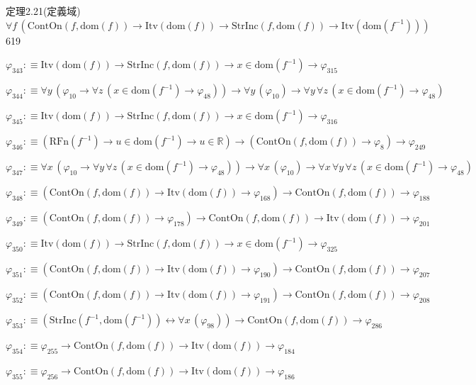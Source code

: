 \begin{fullproof}{定理2.21(定義域)}{$\forall f\,(\mathrm{ContOn}(f,\mathrm{dom}(f)) \to \mathrm{Itv}(\mathrm{dom}(f)) \to \mathrm{StrInc}(f,\mathrm{dom}(f)) \to \mathrm{Itv}(\mathrm{dom}(f^{-1})))$}{619}
\begin{abbrevlist}
\item $\varphi_{343} :\equiv \mathrm{Itv}(\mathrm{dom}(f)) \to \mathrm{StrInc}(f,\mathrm{dom}(f)) \to x \in \mathrm{dom}(f^{-1}) \to \varphi_{315}$
\item $\varphi_{344} :\equiv \forall y\,(\varphi_{10} \to \forall z\,(x \in \mathrm{dom}(f^{-1}) \to \varphi_{48})) \to \forall y\,(\varphi_{10}) \to \forall y\,\forall z\,(x \in \mathrm{dom}(f^{-1}) \to \varphi_{48})$
\item $\varphi_{345} :\equiv \mathrm{Itv}(\mathrm{dom}(f)) \to \mathrm{StrInc}(f,\mathrm{dom}(f)) \to x \in \mathrm{dom}(f^{-1}) \to \varphi_{316}$
\item $\varphi_{346} :\equiv (\mathrm{RFn}(f^{-1}) \to u \in \mathrm{dom}(f^{-1}) \to u \in \mathbb{R}) \to (\mathrm{ContOn}(f,\mathrm{dom}(f)) \to \varphi_{8}) \to \varphi_{249}$
\item $\varphi_{347} :\equiv \forall x\,(\varphi_{10} \to \forall y\,\forall z\,(x \in \mathrm{dom}(f^{-1}) \to \varphi_{48})) \to \forall x\,(\varphi_{10}) \to \forall x\,\forall y\,\forall z\,(x \in \mathrm{dom}(f^{-1}) \to \varphi_{48})$
\item $\varphi_{348} :\equiv (\mathrm{ContOn}(f,\mathrm{dom}(f)) \to \mathrm{Itv}(\mathrm{dom}(f)) \to \varphi_{168}) \to \mathrm{ContOn}(f,\mathrm{dom}(f)) \to \varphi_{188}$
\item $\varphi_{349} :\equiv (\mathrm{ContOn}(f,\mathrm{dom}(f)) \to \varphi_{178}) \to \mathrm{ContOn}(f,\mathrm{dom}(f)) \to \mathrm{Itv}(\mathrm{dom}(f)) \to \varphi_{201}$
\item $\varphi_{350} :\equiv \mathrm{Itv}(\mathrm{dom}(f)) \to \mathrm{StrInc}(f,\mathrm{dom}(f)) \to x \in \mathrm{dom}(f^{-1}) \to \varphi_{325}$
\item $\varphi_{351} :\equiv (\mathrm{ContOn}(f,\mathrm{dom}(f)) \to \mathrm{Itv}(\mathrm{dom}(f)) \to \varphi_{190}) \to \mathrm{ContOn}(f,\mathrm{dom}(f)) \to \varphi_{207}$
\item $\varphi_{352} :\equiv (\mathrm{ContOn}(f,\mathrm{dom}(f)) \to \mathrm{Itv}(\mathrm{dom}(f)) \to \varphi_{191}) \to \mathrm{ContOn}(f,\mathrm{dom}(f)) \to \varphi_{208}$
\item $\varphi_{353} :\equiv (\mathrm{StrInc}(f^{-1},\mathrm{dom}(f^{-1})) \leftrightarrow \forall x\,(\varphi_{98})) \to \mathrm{ContOn}(f,\mathrm{dom}(f)) \to \varphi_{286}$
\item $\varphi_{354} :\equiv \varphi_{255} \to \mathrm{ContOn}(f,\mathrm{dom}(f)) \to \mathrm{Itv}(\mathrm{dom}(f)) \to \varphi_{184}$
\item $\varphi_{355} :\equiv \varphi_{256} \to \mathrm{ContOn}(f,\mathrm{dom}(f)) \to \mathrm{Itv}(\mathrm{dom}(f)) \to \varphi_{186}$

\end{abbrevlist}
\end{fullproof}
